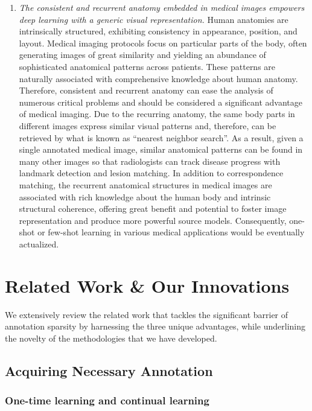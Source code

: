 \begin{enumerate}
    \item \textit{The consistent and recurrent anatomy embedded in medical images empowers deep learning with a generic visual representation.} Human anatomies are intrinsically structured, exhibiting consistency in appearance, position, and layout. Medical imaging protocols focus on particular parts of the body, often generating images of great similarity and yielding an abundance of sophisticated anatomical patterns across patients. These patterns are naturally associated with comprehensive knowledge about human anatomy. Therefore, consistent and recurrent anatomy can ease the analysis of numerous critical problems and should be considered a significant advantage of medical imaging. Due to the recurring anatomy, the same body parts in different images express similar visual patterns and, therefore, can be retrieved by what is known as ``nearest neighbor search''. As a result, given a single annotated medical image, similar anatomical patterns can be found in many other images so that radiologists can track disease progress with landmark detection and lesion matching. In addition to correspondence matching, the recurrent anatomical structures in medical images are associated with rich knowledge about the human body and intrinsic structural coherence, offering great benefit and potential to foster image representation and produce more powerful source models. Consequently, one-shot or few-shot learning in various medical applications would be eventually actualized. 
\end{enumerate}


\section{Related Work \& Our Innovations}
\label{ch1:related_work}


We extensively review the related work that tackles the significant barrier of annotation sparsity by harnessing the three unique advantages, while underlining the novelty of the methodologies that we have developed.

\subsection{Acquiring Necessary Annotation}
\label{ch1:related_work:acquiring_necessary_annotations}

\subsubsection{One-time learning and continual learning}
\label{ch1:related_work:acquiring_necessary_annotation:transfer_learning_medical_imaging}

